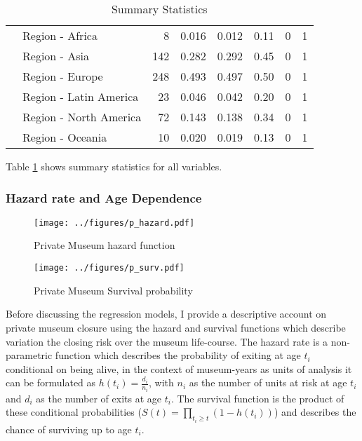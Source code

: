 \documentclass[12pt]{article}
\begin{document}
\begin{table}[ht]
\begin{tabular}{llrrrrrr}
   & Region - Africa & 8 & 0.016 & 0.012 & 0.11 & 0 & 1 \\ 
   & Region - Asia & 142 & 0.282 & 0.292 & 0.45 & 0 & 1 \\ 
   & Region - Europe & 248 & 0.493 & 0.497 & 0.50 & 0 & 1 \\ 
   & Region - Latin America & 23 & 0.046 & 0.042 & 0.20 & 0 & 1 \\ 
   & Region - North America & 72 & 0.143 & 0.138 & 0.34 & 0 & 1 \\ 
   & Region - Oceania & 10 & 0.020 & 0.019 & 0.13 & 0 & 1 \\ 
   \hline
\end{tabular}
\caption{Summary Statistics} 
\label{tbl:t_sumstats}
\end{table}

Table \ref{tbl:t_sumstats} shows summary statistics for all variables.
\subsubsection*{Hazard rate and Age Dependence}


\begin{figure}[htbp]
\centering
\texttt{[image: ../figures/p\_hazard.pdf]}
\caption{\label{fig:p_hazard}Private Museum hazard function}
\end{figure}

\begin{figure}[htbp]
\centering
\texttt{[image: ../figures/p\_surv.pdf]}
\caption{\label{fig:p_surv}Private Museum Survival probability}
\end{figure}


Before discussing the regression models, I provide a descriptive account on private museum closure using the hazard and survival functions which describe variation the closing risk over the museum life-course.
The hazard rate is a non-parametric function which describes the probability of exiting at age \(t_i\) conditional on being alive, in the context of museum-years as units of analysis it can be formulated as \(h(t_i) = \frac{d_i}{n_i}\), with \(n_i\) as the number of units at risk at age \(t_i\) and \(d_i\) as the number of exits at age \(t_i\).
The survival function is the product of these conditional probabilities (\(S(t) = \prod_{t_i \geq t} \left(1-h(t_i) \right)\)) and describes the chance of surviving up to age \(t_i\). 
\end{document}
